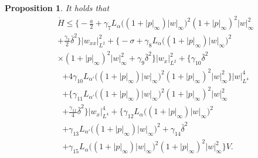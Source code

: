 \documentclass[twocolumn]{autart}
\newtheorem{propo}{Proposition}
\newenvironment{proposition}{\begin{propo}}{\hfill   \end{propo}}
\begin{document}
\begin{proposition}
It holds that 
\begin{align}
&\dot{H} \leq \bigg\{-\frac{a}{2}+\gamma_7L_{\alpha}\bigg((1+|p|_{\infty})|w|_{\infty}\bigg)^2(1+|p|_{\infty})^2|w|_{\infty}^2 \nonumber\\
&+\frac{\gamma_7}{2}\bar{\delta}^2\bigg\}|w_{xx}|_{L^2}^2 + \bigg\{ -\sigma +\gamma_8L_{\alpha}\bigg((1+|p|_{\infty})|w|_{\infty}\bigg)^2\nonumber \\
&\times (1+|p|_{\infty})^2|w|_{\infty}^2+\gamma_9\bar{\delta}^2\bigg\}|w_x|_{L^2}^2 + \bigg\{\gamma_{10}\bar{\delta}^2 \nonumber \end{align}
\begin{align}
&+4\gamma_{10}L_{\alpha'}\bigg((1+|p|_{\infty})|w|_{\infty}\bigg)^2(1+|p|_{\infty})^2|w|_{\infty}^2\bigg\}|w|_{L^4}^4 \nonumber \\
&+\bigg\{ \gamma_{11}L_{\alpha'}\bigg((1+|p|_{\infty})|w|_{\infty}\bigg)^2(1+|p|_{\infty})^2|w|_{\infty}^2 \nonumber \\
&+\frac{\gamma_{11}}{4}\bar{\delta}^2\bigg\}|w_x|_{L^4}^4+\bigg\{\gamma_{12}L_{\alpha}\bigg((1+|p|_{\infty})|w|_{\infty}\bigg)^2 \nonumber \\
&+\gamma_{13}L_{\alpha'}\bigg((1+|p|_{\infty})|w|_{\infty}\bigg)^2+\gamma_{14}\bar{\delta}^2 \nonumber \\
&+\gamma_{15}L_{\alpha}\bigg((1+|p|_{\infty})|w|_{\infty}\bigg)^2(1+|p|_{\infty})^2|w|_{\infty}^2  \bigg\}V.\label{To_Prove_2}
\end{align}
\hfill  
\end{proposition}
\end{document}
